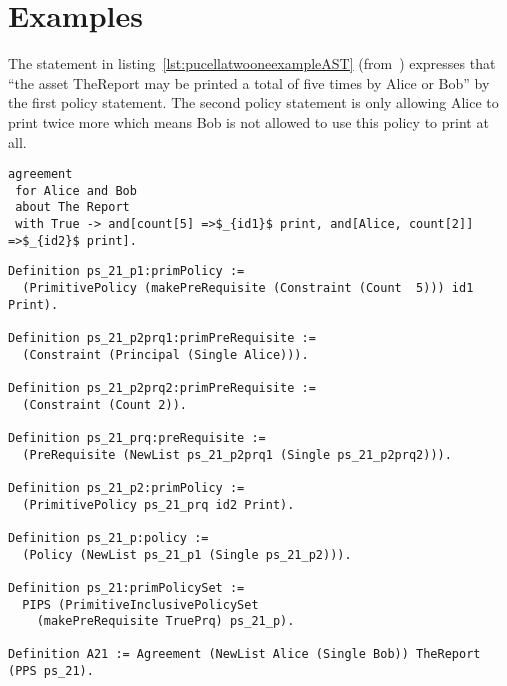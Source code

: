\section{Examples}

The statement in listing~\ref{lst:pucellatwooneexampleAST} (from~\cite{pucella2006}) expresses that ``the asset TheReport may be printed a total of five times by Alice or Bob'' by the first policy statement. The second policy statement is only allowing Alice to print twice more which means Bob is not allowed to use this policy to print at all.

\lstset{language=Pucella2006}
\begin{minipage}[c]{0.95\textwidth}
\begin{lstlisting}[frame=single, caption={Agreement of Example 2.1}, label={lst:pucellatwooneexampleAST}, mathescape]
agreement
 for Alice and Bob 
 about The Report 
 with True -> and[count[5] =>$_{id1}$ print, and[Alice, count[2]] =>$_{id2}$ print].
\end{lstlisting}
\end{minipage} 

\begin{minipage}[c]{0.95\textwidth}
\begin{lstlisting}
Definition ps_21_p1:primPolicy := 
  (PrimitivePolicy (makePreRequisite (Constraint (Count  5))) id1 Print).

Definition ps_21_p2prq1:primPreRequisite := 
  (Constraint (Principal (Single Alice))).

Definition ps_21_p2prq2:primPreRequisite := 
  (Constraint (Count 2)).

Definition ps_21_prq:preRequisite := 
  (PreRequisite (NewList ps_21_p2prq1 (Single ps_21_p2prq2))).

Definition ps_21_p2:primPolicy := 
  (PrimitivePolicy ps_21_prq id2 Print).

Definition ps_21_p:policy := 
  (Policy (NewList ps_21_p1 (Single ps_21_p2))).

Definition ps_21:primPolicySet :=
  PIPS (PrimitiveInclusivePolicySet
    (makePreRequisite TruePrq) ps_21_p).

Definition A21 := Agreement (NewList Alice (Single Bob)) TheReport (PPS ps_21).
\end{lstlisting}
\end{minipage} 

